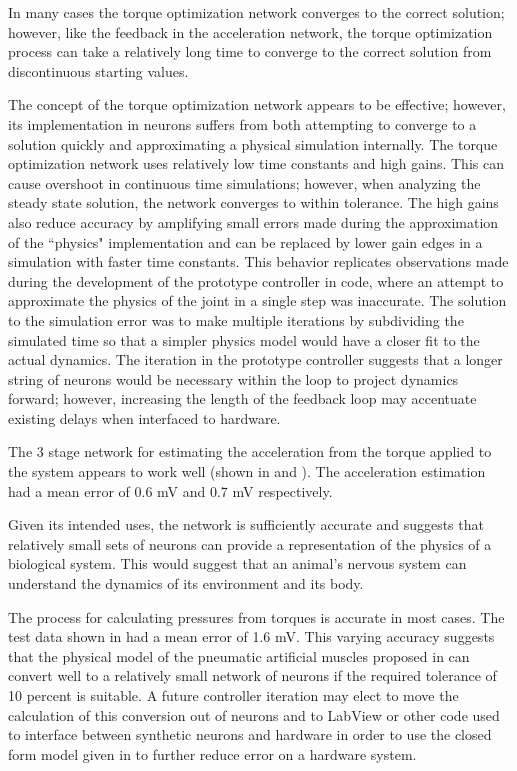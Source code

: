 
In many cases the torque optimization network converges to the
correct solution; however, like the feedback in the acceleration network, the torque optimization process can
take a relatively long time to converge to the correct solution from discontinuous starting
values.

The concept of the torque optimization network appears to be effective; however,
its implementation in neurons suffers from both attempting to converge to a
solution quickly and approximating a physical simulation internally. The torque optimization network
uses relatively low time constants and high gains. This can cause overshoot in continuous time simulations; however,
when analyzing the steady state solution, the network converges to within tolerance.
The high gains also reduce accuracy by amplifying small errors made during the
approximation of the ``physics" implementation and can be replaced by lower gain edges in a simulation with faster time constants.
This behavior replicates
observations made during the development of the prototype controller in code,
where an attempt to approximate the physics of the joint in a single step was
inaccurate. The solution to the simulation error was to make multiple iterations by subdividing
the simulated time so that a simpler physics model would have a closer fit to
the actual dynamics. The iteration in the prototype controller suggests that a longer string of neurons would be
necessary within the loop to project dynamics forward; however, increasing the length of the feedback loop may accentuate existing delays when interfaced to hardware.


The 3 stage network for estimating the acceleration from the torque applied to
the system appears to work well (shown in  and ). The acceleration estimation had a mean error of 
0.6 mV and 0.7 mV respectively.

Given its intended uses, the network is sufficiently accurate and suggests that
relatively small sets of neurons can provide a representation of the physics of
a biological system. This would suggest that an animal's nervous system can understand the dynamics of its environment and its body.


The process for calculating pressures from torques is accurate in most cases. The test data shown in  had a mean error of 1.6 mV. This varying accuracy suggests that the physical
model of the pneumatic artificial muscles proposed in \cite{HuntPMuscles}
can convert well to a relatively small network of neurons if the required tolerance of 10 percent is suitable.
A future controller iteration may elect to move the
calculation of this conversion out of neurons and
to LabView or other code used to interface between synthetic neurons and
hardware in order to use the closed form model given in \cite{HuntPMuscles} to further reduce error on a hardware system.

